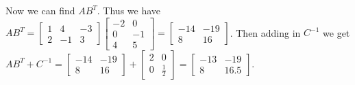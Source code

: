 \documentclass[a4paper]{article}
\begin{document}
\begin{enumerate}[(a)]
\begin{itemize}
    Now we can find $AB^T$. Thus we have
    $AB^T = \left[\begin{matrix}1 & 4 & -3 \\2 & -1 & 3\end{matrix}\right] 
      \left[\begin{matrix} -2 & 0  \\0 & -1 \\ 4 & 5 \end{matrix}\right] 
      = \left[\begin{matrix} -14 & -19  \\8 & 16 \end{matrix}\right]$. 
    Then adding in $C^{-1}$ we get \\
    $AB^T+C^{-1} = \left[\begin{matrix} -14 & -19 \\8 & 16 \end{matrix}\right] 
      + \left[\begin{matrix} 2 & 0  \\0 & \frac{1}{2} \end{matrix}\right] 
      = \left[\begin{matrix} -13 & -19  \\ 8 & 16.5 \end{matrix}\right].$
  \end{itemize}
\end{enumerate}
\end{document}
